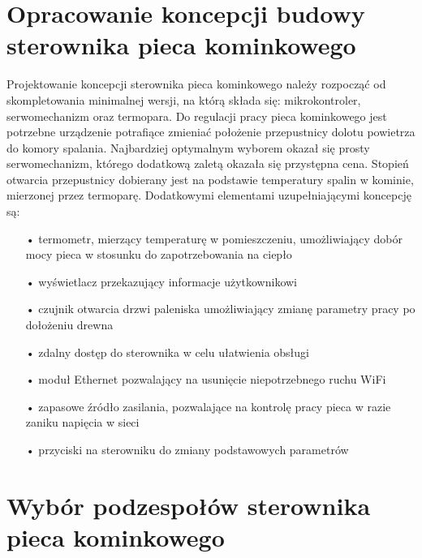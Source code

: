 \documentclass[11pt]{report}
\begin{document}
 \chapter[Opracowanie koncepcji budowy sterownika pieca\\ kominkowego]{Opracowanie koncepcji budowy sterownika pieca kominkowego}\label{ch:koncepcja}
 Projektowanie koncepcji sterownika pieca kominkowego należy rozpocząć od skompletowania minimalnej wersji, na którą składa się: mikrokontroler, serwomechanizm oraz termopara. Do regulacji pracy pieca kominkowego jest potrzebne urządzenie potrafiące zmieniać położenie przepustnicy dolotu powietrza do komory spalania. Najbardziej optymalnym wyborem okazał się prosty serwomechanizm, którego dodatkową zaletą okazała się przystępna cena. Stopień otwarcia przepustnicy dobierany jest na podstawie temperatury spalin w kominie, mierzonej przez termoparę.
 Dodatkowymi elementami uzupełniającymi koncepcję są:
 \begin{enumerate}
 \item[•] termometr, mierzący temperaturę w pomieszczeniu, umożliwiający dobór mocy pieca w stosunku do zapotrzebowania na ciepło
 \item[•] wyświetlacz przekazujący informacje użytkownikowi
 \item[•] czujnik otwarcia drzwi paleniska umożliwiający zmianę parametry pracy po dołożeniu drewna
 \item[•] zdalny dostęp do sterownika w celu ułatwienia obsługi
 \item[•] moduł Ethernet pozwalający na usunięcie niepotrzebnego ruchu WiFi
 \item[•] zapasowe źródło zasilania, pozwalające na kontrolę pracy pieca w razie zaniku napięcia w sieci
 \item[•] przyciski na sterowniku do zmiany podstawowych parametrów
 \end{enumerate}  
 
  
 \chapter{Wybór podzespołów sterownika pieca kominkowego}\label{ch:wybor}
\end{document}
